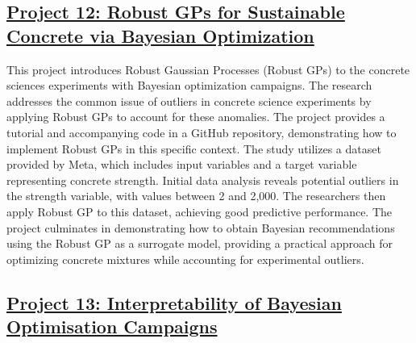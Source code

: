  \subsection*{\href{https://www.youtube.com/watch?v=jSPGCgH31Hc}{Project 12: Robust GPs for Sustainable Concrete via Bayesian Optimization}}

This project introduces Robust Gaussian Processes (Robust GPs)\cite{altamirano2023robust} to the concrete sciences experiments with Bayesian optimization campaigns. The research addresses the common issue of outliers in concrete science experiments by applying Robust GPs to account for these anomalies. The project provides a tutorial and accompanying code in a GitHub repository, demonstrating how to implement Robust GPs in this specific context. The study utilizes a dataset provided by Meta\cite{ament2310sustainable}, which includes input variables and a target variable representing concrete strength. Initial data analysis reveals potential outliers in the strength variable, with values between 2 and 2,000. The researchers then apply Robust GP to this dataset, achieving good predictive performance. The project culminates in demonstrating how to obtain Bayesian recommendations using the Robust GP as a surrogate model, providing a practical approach for optimizing concrete mixtures while accounting for experimental outliers.
 \subsection*{\href{https://www.youtube.com/watch?v=Cyyj9ySybZE}{Project 13: Interpretability of Bayesian Optimisation Campaigns}}

